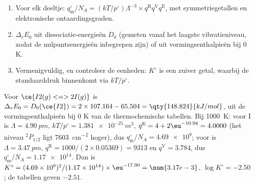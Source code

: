 \begin{method}\label{met:b3:statistical-thermo-applied:k-stat}
\begin{enumerate}
  \item Voor elk deeltje: $q^\circ_{\mathrm m}/N_A = (kT/p^\circ)\Lambda^{-3}\times q^{\mathrm R}q^{\mathrm V}q^{\mathrm E}$, met
        symmetriegetallen en elektronische ontaardingsgraden.
  \item $\Delta_rE_0$ uit dissociatie-energieën $D_0$ (gemeten vanaf het
        laagste vibratieniveau, zodat de nulpuntsenergieën inbegrepen zijn)
        of uit vormingsenthalpieën bij 0 K.
  \item Vermenigvuldig, en controleer de eenheden: $K^\circ$ is een zuiver
        getal, waarbij de standaarddruk binnenkomt via $kT/p^\circ$.
\end{enumerate}
\end{method}

\begin{example}\label{ex:b3:statistical-thermo-applied:iodine}
Voor $\ce{I2(g) <=> 2 I(g)}$ is $\Delta_rE_0 = D_0(\ce{I2}) = 2 \times 107.164 - 65.504 = \qty{148.824}{kJ/mol}$,
uit de vormingsenthalpieën bij 0 K van de thermochemische tabellen. Bij
\qty{1000}{K}: voor I is $\Lambda = \qty{4.90}{pm}$, $kT/p^\circ = \qty{1.381e-25}{m^3}$, $q^{\mathrm E} = 4 +
2\eu^{-10.94} = 4.0000$ (het niveau ${}^2P_{1/2}$ ligt \qty{7603}{cm^{-1}}
hoger), dus $q^\circ_{\mathrm m}/N_A = \num{4.69e9}$;
voor  is $\Lambda = \qty{3.47}{pm}$, $q^{\mathrm R} = 1000/(2 \times 0.05369) = 9313$ en $q^{\mathrm V} = 3.784$, dus
$q^\circ_{\mathrm m}/N_A = \num{1.17e14}$. Dan is $K^\circ = (4.69\times10^9)^2/(1.17\times10^{14}) \times \eu^{-17.90} =
\num{3.17e-3}$, $\log K^\circ = -2.50$; de tabellen geven $-2.51$.
\end{example}

